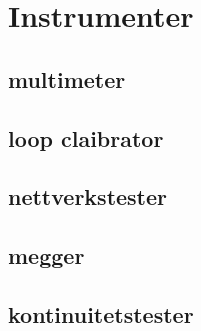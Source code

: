 \section{Instrumenter}
\subsection{multimeter}
\subsection{loop claibrator}
\subsection{nettverkstester}
\subsection{megger}
\subsection{kontinuitetstester}






